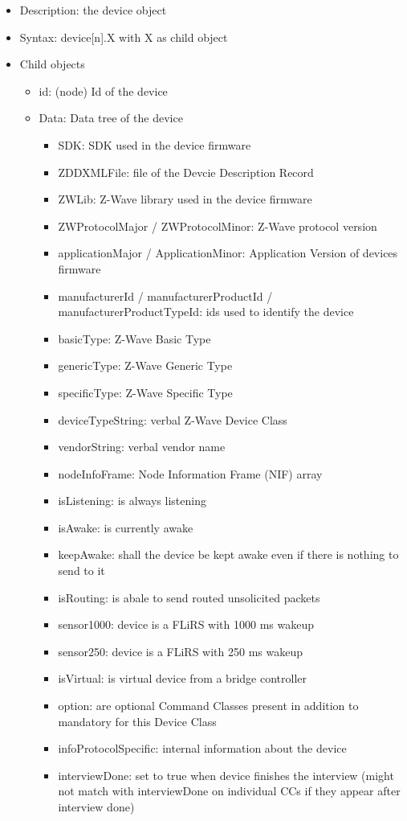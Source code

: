 \begin {itemize}
\item Description: the device object
\item Syntax:  device[n].X with  X as child object
\item Child objects
\begin {itemize}
\item id: (node) Id of the device
\item Data: Data tree of the device
\begin {itemize}
\item SDK: SDK used in the device firmware
\item ZDDXMLFile: file of the Devcie Description Record
\item ZWLib: Z-Wave library used in the device firmware
\item ZWProtocolMajor / ZWProtocolMinor: Z-Wave protocol version
\item applicationMajor / ApplicationMinor: Application Version of devices firmware
\item manufacturerId / manufacturerProductId / manufacturerProductTypeId: ids used to identify the device
\item basicType: Z-Wave Basic Type
\item genericType: Z-Wave Generic Type
\item specificType: Z-Wave Specific Type
\item deviceTypeString: verbal Z-Wave Device Class
\item vendorString: verbal vendor name

\item nodeInfoFrame: Node Information Frame (NIF) array
\item isListening: is always listening
\item isAwake: is currently awake
\item keepAwake: shall the device be kept awake even if there is nothing to send to it
\item isRouting: is abale to send routed unsolicited packets
\item sensor1000: device is a FLiRS with 1000 ms wakeup
\item sensor250: device is a FLiRS with 250 ms wakeup
\item isVirtual: is virtual device from a bridge controller
\item option: are optional Command Classes present in addition to mandatory for this Device Class
\item infoProtocolSpecific: internal information about the device
\item interviewDone: set to true when device finishes the interview (might not match with interviewDone on individual CCs if they appear after interview done)


\end{itemize}
\end{itemize}
\end{itemize}
